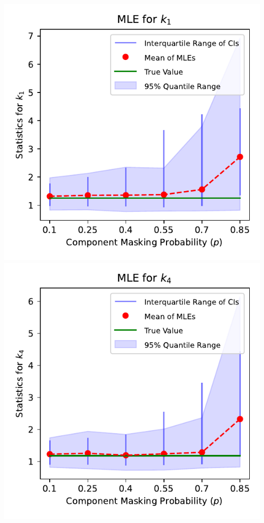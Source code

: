 \documentclass{article}
\begin{document}
\pagestyle{empty}

\noindent
\begin{minipage}[t]{0.5\textwidth}
  \centering
  \includegraphics[width=\textwidth,height=0.33\textheight,keepaspectratio]{plot-p-vs-shape.1.pdf}\\
  \vspace{0.5mm}
  \includegraphics[width=\textwidth,height=0.33\textheight,keepaspectratio]{plot-p-vs-shape.4.pdf}\\

\end{minipage}
\end{document}
